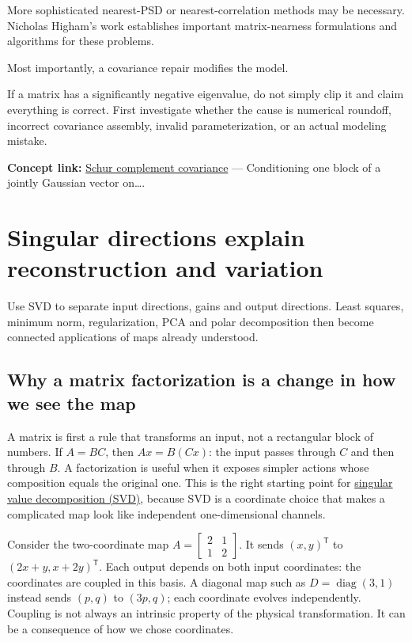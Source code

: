 More sophisticated nearest-PSD or nearest-correlation methods may be necessary. Nicholas Higham's work establishes important matrix-nearness formulations and algorithms for these problems.

Most importantly, a covariance repair modifies the model.

If a matrix has a significantly negative eigenvalue, do not simply clip it and claim everything is correct. First investigate whether the cause is numerical roundoff, incorrect covariance assembly, invalid parameterization, or an actual modeling mistake.

\textbf{Concept link:} \hyperref[02-foundations-ii-ch024-waiting-times-event-counts-and-covariance-geometry]{Schur complement covariance} --- Conditioning one block of a jointly Gaussian vector on\ldots.

\chapter{Singular directions explain reconstruction and variation}\label{02-foundations-ii-ch024-singular-directions-explain-reconstruction-and-variation}

Use SVD to separate input directions, gains and output directions. Least squares, minimum norm, regularization, PCA and polar decomposition then become connected applications of maps already understood.

\section{Why a matrix factorization is a change in how we see the map}\label{02-foundations-ii-ch024-why-a-matrix-factorization-is-a-change-in-how-we-see-the-map}

A matrix is first a rule that transforms an input, not a rectangular block of numbers. If \(A=BC\), then \(Ax=B(Cx)\): the input passes through \(C\) and then through \(B\). A factorization is useful when it exposes simpler actions whose composition equals the original one. This is the right starting point for \hyperref[02-foundations-ii-ch024-full-thin-and-compact-shapes-for-tall-and-wide-matrices]{singular value decomposition (SVD)}, because SVD is a coordinate choice that makes a complicated map look like independent one-dimensional channels.

Consider the two-coordinate map \(A=\begin{bmatrix}2&1\\1&2\end{bmatrix}\). It sends \((x,y)^\mathsf T\) to \((2x+y,x+2y)^\mathsf T\). Each output depends on both input coordinates: the coordinates are coupled in this basis. A diagonal map such as \(D=\operatorname{diag}(3,1)\) instead sends \((p,q)\) to \((3p,q)\); each coordinate evolves independently. Coupling is not always an intrinsic property of the physical transformation. It can be a consequence of how we chose coordinates.

